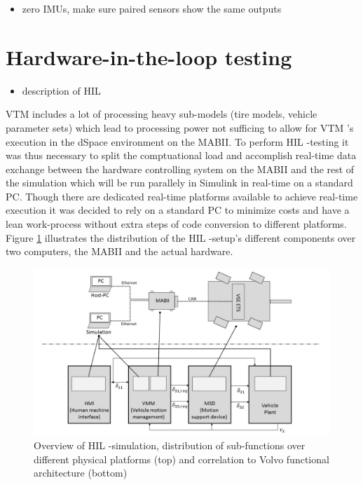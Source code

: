 \documentclass[ExampleMasters.tex]{subfiles}
\begin{document}
\begin{itemize}
	\item zero IMUs, make sure paired sensors show the same outputs
	
\end{itemize}

\section{Hardware-in-the-loop testing}
\label{sec:HIL}
\begin{itemize}
	\item description of \gls{HIL} 

\end{itemize}

\gls{VTM} includes a lot of processing heavy sub-models (tire models, vehicle parameter sets) which lead to processing power not sufficing to allow for \gls{VTM} 's execution in the dSpace environment on the \gls{MABII}. To perform \gls{HIL} -testing it was thus necessary to split the comptuational load and accomplish real-time data exchange between the hardware controlling system on the \gls{MABII} and the rest of the simulation which will be run parallely in Simulink in real-time on a standard PC. Though there are dedicated real-time platforms available to achieve real-time execution it was decided to rely on a standard PC to minimize costs and have a lean work-process without extra steps of code conversion to different platforms. Figure \ref{fig:HIL_overview} illustrates the distribution of the \gls{HIL} -setup's different components over two computers, the \gls{MABII} and the actual hardware. 

\begin{figure}[h]
	\centering
	\includegraphics[width=1\linewidth]{figures/HIL_overview}
	\caption{Overview of \gls{HIL} -simulation, distribution of sub-functions over different physical platforms (top) and correlation to Volvo functional architecture (bottom)}
	
	\label{fig:HIL_overview}
\end{figure}
\end{document}
